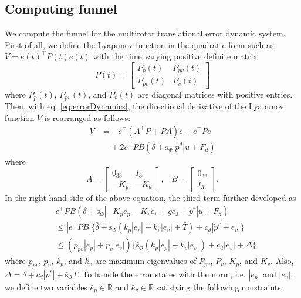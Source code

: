 \documentclass[letterpaper, 10 pt, conference]{ieeeconf}  %
\begin{document}
\subsection{Computing funnel} \label{sec:computeFunnels}
We compute the funnel for the multirotor translational error dynamic system.
First of all, 
we define the Lyapunov function in the quadratic form such as $V = e(t)^\top P(t) e(t)$ with the time varying positive definite matrix
\begin{equation}
P(t) = \left[
\begin{array}{cc}
P_p(t) & P_{pv}(t) \\
P_{pv}(t) & P_v(t)
\end{array}
\right] \label{eq:funnelP}
\end{equation}
where $P_p(t)$, $P_{pv}(t)$, and $P_v(t)$ are diagonal matrices with positive entries.
Then, with eq. \eqref{eq:errorDynamics}, the directional derivative of the Lyapunov function $V$ is rearranged as follows: 
\begin{align}
\dot{V} &= -e^\top ( A^\top P + PA) e + e^\top \dot{P}e \nonumber \\
&\;\;\;\;+2e^\top P B(\delta+\text{s}_\Phi|\ddot{p}^d|{u}+F_d) \nonumber
\end{align}
where
\begin{equation}
A = \left[
\begin{array}{rr}
0_{33} & I_3 \\ -K_p & -K_d 
\end{array}
\right],\;\;\;B = \left[
\begin{array}{r}
0_{33} \\ I_3
\end{array}
\right].\nonumber 
\end{equation}
In the right hand side of the above equation, the third term further developed as
\begin{align}
&e^\top P B(\delta+\text{s}_\Phi|-K_p e_p -K_v e_v + ge_3 + \ddot{p}^r|\bar{u}+F_d) \nonumber \\
&\leq |e^\top P B|\{\bar{\delta} + \bar{\text{s}}_\Phi(k_p|e_p| + k_v|e_v| + \bar{T})+c_d|\dot{p}^r+e_v|\} \nonumber \\
&\leq (p_{pv}|e_p|+p_v|e_v|)\{\bar{\text{s}}_\Phi(k_p|e_p|+k_v|e_v|)+c_d|e_v|+\Delta\}\label{eq:deltaConst}
\end{align}
where $p_{pv}$, $p_v$, $k_p$, and $k_v$ are maximum eigenvalues of $P_{pv}$, $P_v$, $K_p$, and $K_v$.
Also, $\Delta = \bar{\delta}+c_d|\dot{p}^r| + \bar{\text{s}}_\Phi\bar{T}$.
To handle the error states with the norm, i.e. $|e_p|$ and $|e_v|$, we define two variables $\bar{e}_p\in\mathbb{R}$ and $\bar{e}_v\in\mathbb{R}$ satisfying the following constraints:
\end{document}
